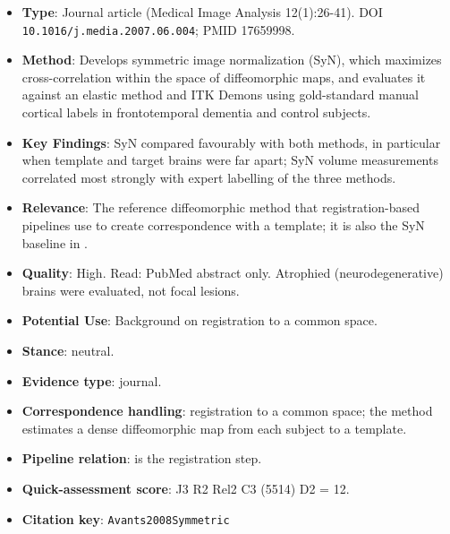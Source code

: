 \documentclass[journal,onecolumn]{IEEEtran}
\begin{document}
\begin{itemize}

\item{} \textbf{Type}: Journal article (Medical Image Analysis 12(1):26-41). DOI \nolinkurl{10.1016/j.media.2007.06.004}; PMID 17659998.

\item{} \textbf{Method}: Develops symmetric image normalization (SyN), which maximizes cross-correlation within the space of diffeomorphic maps, and evaluates it against an elastic method and ITK Demons using gold-standard manual cortical labels in frontotemporal dementia and control subjects.

\item{} \textbf{Key Findings}: SyN compared favourably with both methods, in particular when template and target brains were far apart; SyN volume measurements correlated most strongly with expert labelling of the three methods.

\item{} \textbf{Relevance}: The reference diffeomorphic method that registration-based pipelines use to create correspondence with a template; it is also the SyN baseline in \cite{Choi2026Tumor}.

\item{} \textbf{Quality}: High. Read: PubMed abstract only. Atrophied (neurodegenerative) brains were evaluated, not focal lesions.

\item{} \textbf{Potential Use}: Background on registration to a common space.

\item{} \textbf{Stance}: neutral.

\item{} \textbf{Evidence type}: journal.

\item{} \textbf{Correspondence handling}: registration to a common space; the method estimates a dense diffeomorphic map from each subject to a template.

\item{} \textbf{Pipeline relation}: is the registration step.

\item{} \textbf{Quick-assessment score}: J3 R2 Rel2 C3 (5514) D2 = 12.

\item{} \textbf{Citation key}: \texttt{Avants2008Symmetric}

\end{itemize}
\end{document}
